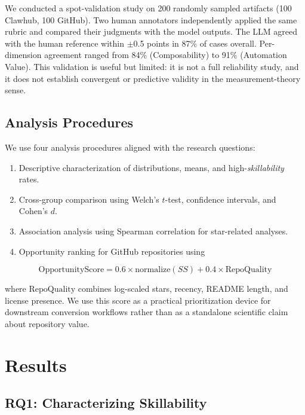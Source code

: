 \documentclass[sigconf,review,anonymous,nonacm]{acmart}
\newcommand{\skillability}{\textit{skillability}\xspace}
\newcommand{\sscore}{\textit{SS}\xspace}
\begin{document}
We conducted a spot-validation study on 200 randomly sampled artifacts (100 Clawhub, 100 GitHub). Two human annotators independently applied the same rubric and compared their judgments with the model outputs. The LLM agreed with the human reference within $\pm$0.5 points in 87\% of cases overall. Per-dimension agreement ranged from 84\% (Composability) to 91\% (Automation Value). This validation is useful but limited: it is not a full reliability study, and it does not establish convergent or predictive validity in the measurement-theory sense.

\subsection{Analysis Procedures}

We use four analysis procedures aligned with the research questions:
\begin{enumerate}[leftmargin=*,itemsep=2pt]
    \item Descriptive characterization of distributions, means, and high-\skillability rates.
    \item Cross-group comparison using Welch's $t$-test, confidence intervals, and Cohen's $d$.
    \item Association analysis using Spearman correlation for star-related analyses.
    \item Opportunity ranking for GitHub repositories using
\end{enumerate}

\begin{equation}
\mathrm{OpportunityScore} = 0.6 \times \mathrm{normalize}(\sscore) + 0.4 \times \mathrm{RepoQuality}
\end{equation}

\noindent where \(\mathrm{RepoQuality}\) combines log-scaled stars, recency, README length, and license presence. We use this score as a practical prioritization device for downstream conversion workflows rather than as a standalone scientific claim about repository value.

\section{Results}

\subsection{RQ1: Characterizing Skillability}
\end{document}
